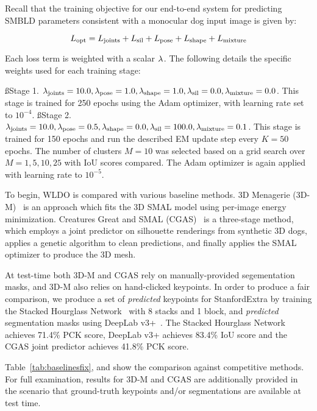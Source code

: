 Recall that the training objective for our end-to-end system for predicting SMBLD parameters consistent with a monocular dog input image is given by:

\begin{equation}
    L_{\textrm{opt}}=L_{\textrm{joints}}+L_{\textrm{sil}}+L_{\textrm{pose}}+L_{\textrm{shape}}+L_{\textrm{mixture}}
\end{equation}

Each loss term is weighted with a scalar $\lambda_\textrm{}$. The following details the specific weights used for each training stage:

\ss{Stage 1.} $\lambda_\textrm{joints}=10.0,\lambda_\textrm{pose}=1.0,\lambda_\textrm{shape}=1.0,\lambda_\textrm{sil}=0.0,\lambda_\textrm{mixture}=0.0$. This stage is trained for 250 epochs using the Adam optimizer, with learning rate set to $10^{-4}$. 
\ss{Stage 2.} $\lambda_\textrm{joints}=10.0,\lambda_\textrm{pose}=0.5,\lambda_\textrm{shape}=0.0,\lambda_\textrm{sil}=100.0,\lambda_\textrm{mixture}=0.1$. This stage is trained for 150 epochs and run the described EM update step every $K=50$ epochs. The number of clusters $M=10$ was selected based on a grid search over $M=1,5,10,25$ with IoU scores compared. The Adam optimizer is again applied with learning rate to $10^{-5}$.

To begin, WLDO is compared with various baseline methods. 3D Menagerie (3D-M)~\cite{zuffi2017menagerie} is an approach which fits the 3D SMAL model using per-image energy minimization. Creatures Great and SMAL (CGAS)~\cite{biggs2018creatures} is a three-stage method, which employs a joint predictor on silhouette renderings from synthetic 3D dogs, applies a genetic algorithm to clean predictions, and finally applies the SMAL optimizer to produce the 3D mesh.

At test-time both 3D-M and CGAS rely on manually-provided segementation masks, and 3D-M also relies on hand-clicked keypoints. In order to produce a fair comparison, we produce a set of \emph{predicted} keypoints for StanfordExtra by training the Stacked Hourglass Network~\cite{newell2016stacked} with 8 stacks and 1 block, and \emph{predicted} segmentation masks using DeepLab v3+~\cite{deeplabv3plus}. The Stacked Hourglass Network achieves 71.4\% PCK score, DeepLab v3+ achieves 83.4\% IoU score and the CGAS joint predictor achieves 41.8\% PCK score. 


% 
% 

Table~\ref{tab:baselinesfix},  and  show the comparison against competitive methods. For full examination, results for 3D-M and CGAS are additionally provided in the scenario that ground-truth keypoints and/or segmentations are available at test time. 

